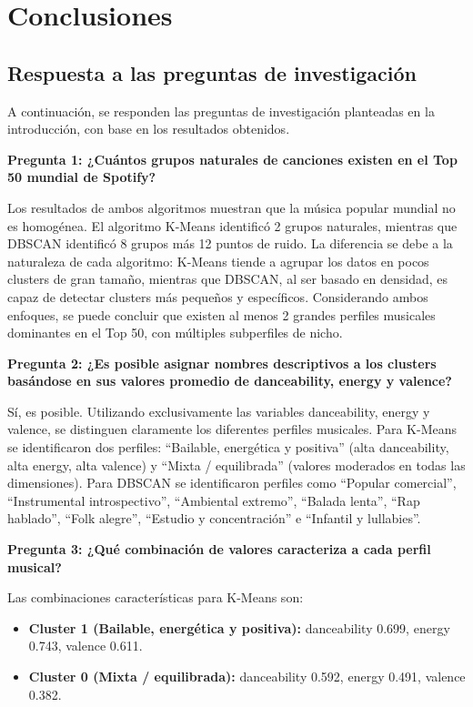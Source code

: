 \section{Conclusiones}

\subsection{Respuesta a las preguntas de investigación}

A continuación, se responden las preguntas de investigación planteadas en la introducción, con base en los resultados obtenidos.

\textbf{Pregunta 1: ¿Cuántos grupos naturales de canciones existen en el Top 50 mundial de Spotify?}

Los resultados de ambos algoritmos muestran que la música popular mundial no es homogénea. El algoritmo K-Means identificó 2 grupos naturales, mientras que DBSCAN identificó 8 grupos más 12 puntos de ruido. La diferencia se debe a la naturaleza de cada algoritmo: K-Means tiende a agrupar los datos en pocos clusters de gran tamaño, mientras que DBSCAN, al ser basado en densidad, es capaz de detectar clusters más pequeños y específicos. Considerando ambos enfoques, se puede concluir que existen al menos 2 grandes perfiles musicales dominantes en el Top 50, con múltiples subperfiles de nicho.

\textbf{Pregunta 2: ¿Es posible asignar nombres descriptivos a los clusters basándose en sus valores promedio de danceability, energy y valence?}

Sí, es posible. Utilizando exclusivamente las variables danceability, energy y valence, se distinguen claramente los diferentes perfiles musicales. Para K-Means se identificaron dos perfiles: \enquote{Bailable, energética y positiva} (alta danceability, alta energy, alta valence) y \enquote{Mixta / equilibrada} (valores moderados en todas las dimensiones). Para DBSCAN se identificaron perfiles como \enquote{Popular comercial}, \enquote{Instrumental introspectivo}, \enquote{Ambiental extremo}, \enquote{Balada lenta}, \enquote{Rap hablado}, \enquote{Folk alegre}, \enquote{Estudio y concentración} e \enquote{Infantil y lullabies}.

\textbf{Pregunta 3: ¿Qué combinación de valores caracteriza a cada perfil musical?}

Las combinaciones características para K-Means son:

\begin{itemize}
    \item \textbf{Cluster 1 (Bailable, energética y positiva):} danceability 0.699, energy 0.743, valence 0.611.
    \item \textbf{Cluster 0 (Mixta / equilibrada):} danceability 0.592, energy 0.491, valence 0.382.
\end{itemize}

